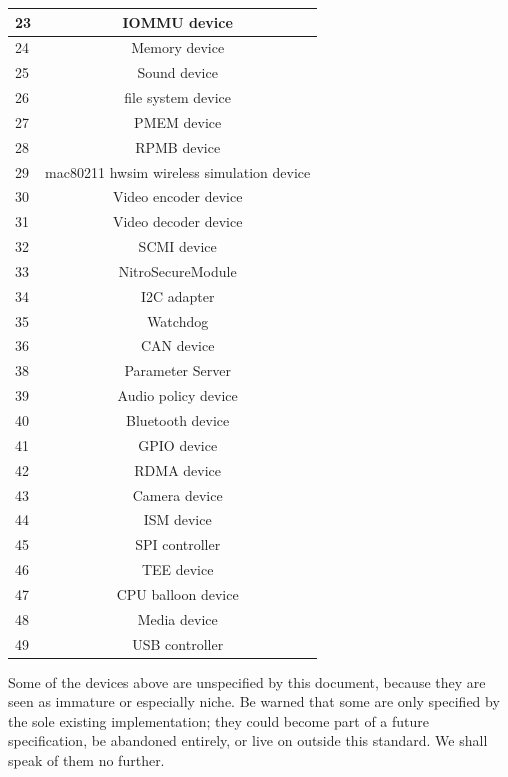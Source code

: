\begin{longtable} { |l|c| }
\hline
23         &   IOMMU device \\
\hline
24         &   Memory device \\
\hline
25         &   Sound device \\
\hline
26         &   file system device \\
\hline
27         &   PMEM device \\
\hline
28         &   RPMB device \\
\hline
29         &   mac80211 hwsim wireless simulation device \\
\hline
30         &   Video encoder device \\
\hline
31         &   Video decoder device \\
\hline
32         &   SCMI device \\
\hline
33         &   NitroSecureModule \\
\hline
34         &   I2C adapter \\
\hline
35         &   Watchdog \\
\hline
36         &   CAN device \\
\hline
38         &   Parameter Server \\
\hline
39         &   Audio policy device \\
\hline
40         &   Bluetooth device \\
\hline
41         &   GPIO device \\
\hline
42         &   RDMA device \\
\hline
43         &   Camera device \\
\hline
44         &   ISM device \\
\hline
45         &   SPI controller \\
\hline
46         &   TEE device \\
\hline
47         &   CPU balloon device \\
\hline
48         &   Media device \\
\hline
49         &   USB controller \\
\hline
\end{longtable}

Some of the devices above are unspecified by this document,
because they are seen as immature or especially niche.  Be warned
that some are only specified by the sole existing implementation;
they could become part of a future specification, be abandoned
entirely, or live on outside this standard.  We shall speak of
them no further.

